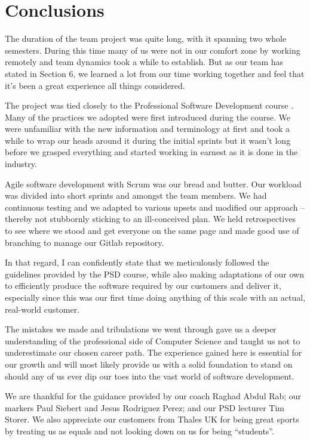 \documentclass{l3proj}
\begin{document}
\section{Conclusions}

The duration of the team project was quite long, with it spanning two whole semesters. During this time many of us were not in our comfort zone by working remotely and team dynamics took a while to establish. But as our team has stated in Section 6, we learned a lot from our time working together and feel that it’s been a great experience all things considered.

The project was tied closely to the Professional Software Development course \cite{psd}. Many of the practices we adopted were first introduced during the course. We were unfamiliar with the new information and terminology at first and took a while to wrap our heads around it during the initial sprints but it wasn’t long before we grasped everything and started working in earnest as it is done in the industry.

Agile software development with Scrum was our bread and butter. Our workload was divided into short sprints and amongst the team members. We had continuous testing and we adapted to various upsets and modified our approach – thereby not stubbornly sticking to an ill-conceived plan. We held retrospectives to see where we stood and get everyone on the same page and made good use of branching to manage our Gitlab repository.

In that regard, I can confidently state that we meticulously followed the guidelines provided by the PSD course, while also making adaptations of our own to efficiently produce the software required by our customers and deliver it, especially since this was our first time doing anything of this scale with an actual, real-world customer.

The mistakes we made and tribulations we went through gave us a deeper understanding of the professional side of Computer Science and taught us not to underestimate our chosen career path. The experience gained here is essential for our growth and will most likely provide us with a solid foundation to stand on should any of us ever dip our toes into the vast world of software development.

We are thankful for the guidance provided by our coach Raghad Abdul Rab; our markers Paul Siebert and Jesus Rodriguez Perez; and our PSD lecturer Tim Storer. We also appreciate our customers from Thales UK for being great sports by treating us as equals and not looking down on us for being “students”.

\newpage



\end{document}
